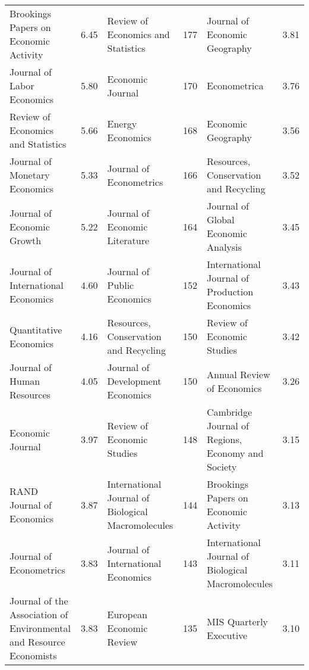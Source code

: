 \begin{table}[p]
\begin{tabularx}{\hsize}{@{}Yr|Yr|Yr@{}}
                              Brookings Papers on Economic Activity &  6.45 &                 Review of Economics and Statistics & 177 &                      Journal of Economic Geography & 3.81 \\
                                         Journal of Labor Economics &  5.80 &                                   Economic Journal & 170 &                                       Econometrica & 3.76 \\
                                 Review of Economics and Statistics &  5.66 &                                   Energy Economics & 168 &                                 Economic Geography & 3.56 \\
                                      Journal of Monetary Economics &  5.33 &                            Journal of Econometrics & 166 &              Resources, Conservation and Recycling & 3.52 \\
                                         Journal of Economic Growth &  5.22 &                     Journal of Economic Literature & 164 &                Journal of Global Economic Analysis & 3.45 \\
                                 Journal of International Economics &  4.60 &                        Journal of Public Economics & 152 &      International Journal of Production Economics & 3.43 \\
                                             Quantitative Economics &  4.16 &              Resources, Conservation and Recycling & 150 &                         Review of Economic Studies & 3.42 \\
                                         Journal of Human Resources &  4.05 &                   Journal of Development Economics & 150 &                         Annual Review of Economics & 3.26 \\
                                                   Economic Journal &  3.97 &                         Review of Economic Studies & 148 &  Cambridge Journal of Regions, Economy and Society & 3.15 \\
                                          RAND Journal of Economics &  3.87 & International Journal of Biological Macromolecules & 144 &              Brookings Papers on Economic Activity & 3.13 \\
                                            Journal of Econometrics &  3.83 &                 Journal of International Economics & 143 & International Journal of Biological Macromolecules & 3.11 \\
Journal of the Association of Environmental and Resource Economists &  3.83 &                           European Economic Review & 135 &                            MIS Quarterly Executive & 3.10 \\
\bottomrule
\end{tabularx}
\end{table}
